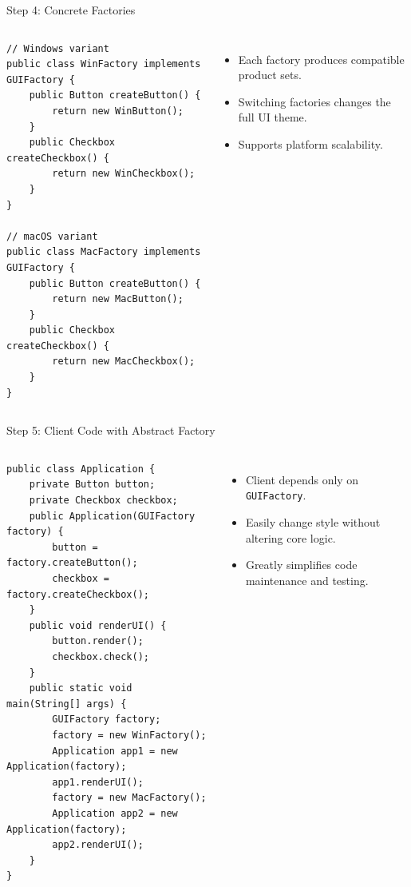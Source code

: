 \documentclass[aspectratio=169, table]{beamer}
\begin{document}
\begin{frame}[fragile]{Step 4: Concrete Factories}
\vspace{20pt}
\begin{columns}[T]
\begin{lstlisting}[style=JavaStyle]
// Windows variant
public class WinFactory implements GUIFactory {
	public Button createButton() {
		return new WinButton();
	}
	public Checkbox createCheckbox() {
		return new WinCheckbox();
	}
}

// macOS variant
public class MacFactory implements GUIFactory {
	public Button createButton() {
		return new MacButton();
	}
	public Checkbox createCheckbox() {
		return new MacCheckbox();
	}
}
\end{lstlisting}

\begin{itemize}
\item Each factory produces compatible product sets.
\item Switching factories changes the full UI theme.
\item Supports platform scalability.
\end{itemize}
\end{columns}
\end{frame}

\begin{frame}[fragile]{Step 5: Client Code with Abstract Factory}
\vspace{30pt}
\begin{columns}[T]
\begin{lstlisting}[style=JavaStyle]
public class Application {
	private Button button;
	private Checkbox checkbox;
	public Application(GUIFactory factory) {
		button = factory.createButton();
		checkbox = factory.createCheckbox();
	}
	public void renderUI() {
		button.render();
		checkbox.check();
	}
	public static void main(String[] args) {
		GUIFactory factory;
		factory = new WinFactory();
		Application app1 = new Application(factory);
		app1.renderUI();
		factory = new MacFactory();
		Application app2 = new Application(factory);
		app2.renderUI();
	}
}
\end{lstlisting}

\begin{itemize}
\item Client depends only on \texttt{GUIFactory}.
\item Easily change style without altering core logic.
\item Greatly simplifies code maintenance and testing.
\end{itemize}
\end{columns}
\end{frame}
\end{document}
